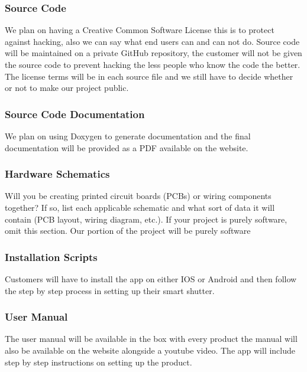 \subsubsection{Source Code}
We plan on having a Creative Common Software License this is to protect against hacking, also we can say what end users can and can not do. Source code will be maintained on a private GitHub repository, the customer will not be given the source code to prevent hacking the less people who know the code the better. The license terms will be in each source file and we still have to decide whether or not to make our project public.

\subsubsection{Source Code Documentation}
We plan on using Doxygen to generate documentation and the final documentation will be provided as a PDF available on the website.

\subsubsection{Hardware Schematics}
Will you be creating printed circuit boards (PCBs) or wiring components together? If so, list each applicable schematic and what sort of data it will contain (PCB layout, wiring diagram, etc.). If your project is purely software, omit this section.
Our portion of the project will be purely software

\subsubsection{Installation Scripts}
Customers will have to install the app on either IOS or Android and then follow the step by step process in setting up their smart shutter.

\subsubsection{User Manual}
The user manual will be available in the box with every product the manual will also be available on the website alongside a youtube video. The app will include step by step instructions on setting up the product. 
